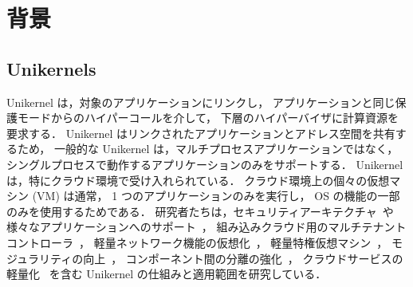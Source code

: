 \section{背景} \label{sec:background}


\subsection{Unikernels}

Unikernel は，対象のアプリケーションにリンクし，
アプリケーションと同じ保護モードからのハイパーコールを介して，
下層のハイパーバイザに計算資源を要求する．
Unikernel はリンクされたアプリケーションとアドレス空間を共有するため，
一般的な Unikernel は，マルチプロセスアプリケーションではなく，
シングルプロセスで動作するアプリケーションのみをサポートする．
Unikernel は，特にクラウド環境で受け入れられている．
クラウド環境上の個々の仮想マシン (VM) は通常，
1 つのアプリケーションのみを実行し，
OS の機能の一部のみを使用するためである．
研究者たちは，セキュリティアーキテクチャ~\cite{MadhavapeddyEtAl-Unikernel}や
様々なアプリケーションへのサポート~\cite{KivityEtAl-OSv,ZhangEtAl-Kylinx,WilliamsEtAl-SoCC18,OlivierEtAl-VEE19,KuoEtAl-Lupine}，
組み込みクラウド用のマルチテナントコントローラ~\cite{MadhavepeddyEtAl-Jitsu}，
軽量ネットワーク機能の仮想化~\cite{MartinsEtAl-NSDI14}，
軽量特権仮想マシン~\cite{MehrabEtAl-Kite}，
モジュラリティの向上~\cite{KuenzerEtAl-Unikraft,KuenzerEtAl-SYSTOR19}，
コンポーネント間の分離の強化~\cite{LefeuvreEtAl-FlexOS,SartakovEtAl-ASPLOS21}，
クラウドサービスの軽量化~\cite{GainEtAl-Spacer}
を含む Unikernel の仕組みと適用範囲を研究している．



